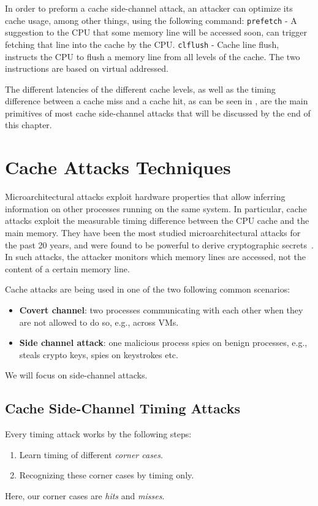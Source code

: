 In order to preform a cache side-channel attack, an attacker can optimize its
cache usage, among other things, using the following command: \texttt{prefetch}
- A suggestion to the CPU that some memory line will be accessed soon, can
trigger fetching that line into the cache by the CPU. \texttt{clflush} - Cache
line flush, instructs the CPU to flush a memory line from all levels of the
cache. The two instructions are based on virtual addressed.

The different latencies of the different cache levels, as well as the timing
difference between a cache miss and a cache hit, as can be seen in
, are the main primitives of most cache
side-channel attacks that will be discussed by the end of this chapter.  

\section{Cache Attacks Techniques} %
\label{sec:cacheattackstech}

Microarchitectural attacks exploit hardware properties that allow inferring
information on other processes running on the same system. In particular, cache
attacks exploit the measurable timing difference between the CPU cache and the
main memory. They have been the most studied microarchitectural attacks for the
past 20 years, and were found to be powerful to derive cryptographic
secrets~\cite{Percival2009}. In such attacks, the attacker monitors which memory
lines are accessed, not the content of a certain memory line.

\noindent Cache attacks are being used in one of the two following common
scenarios:
\begin{itemize}
\item \textbf{Covert channel}: two processes communicating with each other when
they are not allowed to do so, e.g., across VMs.
\item \textbf{Side channel attack}: one malicious process spies on benign
processes, e.g., steals crypto keys, spies on keystrokes etc. 
\end{itemize}
We will focus on side-channel attacks.

\subsection{Cache Side-Channel Timing Attacks}
\label{subsec:cachesidechanneltiming}
Every timing attack works by the following steps:
\begin{enumerate}
    \item Learn timing of different \textit{corner cases}.
    \item Recognizing these corner cases by timing only.
\end{enumerate}
Here, our corner cases are \textit{hits} and \textit{misses}.

